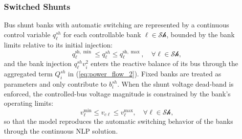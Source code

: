 \documentclass[letterpaper,journal]{IEEEtran}
\begin{document}
\subsubsection{Switched Shunts}
Bus shunt banks with automatic switching are represented by a continuous control variable $q^{sh}_\ell$ for each controllable bank
$\ell \in \mathcal{Sh}$, bounded by the bank limits relative to its initial injection:
\begin{equation}
	\label{eq:shunt_var}
	q^{\mathrm{sh},\min}_\ell \le q^{sh}_\ell \le q^{\mathrm{sh},\max}_\ell,
	\quad \forall \ell \in \mathcal{Sh},
\end{equation}
and the bank injection $q^{sh}_\ell v_i^2$ enters the reactive balance of its bus through the aggregated term $Q_i^{sh}$ in
(\ref{eq:power_flow_2}). Fixed banks are treated as parameters and only contribute to $b_i^{sh}$. When the shunt voltage dead-band
is enforced, the controlled-bus voltage magnitude is constrained by the bank's operating limits:
\begin{equation}
	\label{eq:shunt_voltage}
	v^{\min}_\ell \le v_{c\ell} \le v^{\max}_\ell, \quad \forall \ell \in \mathcal{Sh},
\end{equation}
so that the model reproduces the automatic switching behavior of the banks through the continuous NLP solution.
\end{document}
